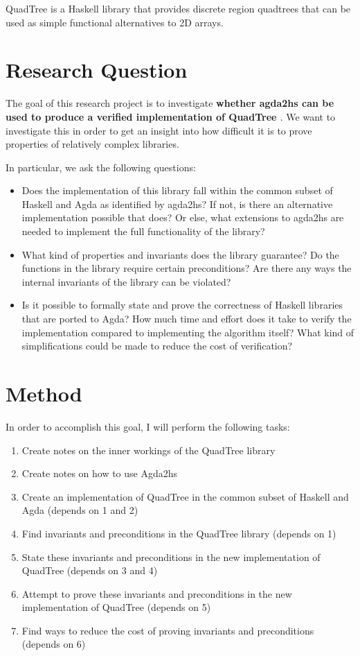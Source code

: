 \documentclass[english]{article}
\begin{document}
QuadTree \cite{quadtree} is a Haskell library that provides discrete region quadtrees that can be used as simple functional alternatives to 2D arrays. 

\section*{Research Question}
The goal of this research project is to investigate \textbf{whether agda2hs \cite{agda2hs} can be used to produce a verified implementation of QuadTree \cite{quadtree}}.
We want to investigate this in order to get an insight into how difficult it is to prove properties of relatively complex libraries. 

In particular, we ask the following questions:
\begin{itemize}
    \item Does the implementation of this library fall within the common subset of Haskell and Agda as identified by agda2hs? If not, is there an alternative implementation possible that does? Or else, what extensions to agda2hs are needed to implement the full functionality of the library?
    \item What kind of properties and invariants does the library guarantee? Do the functions in the library require certain preconditions? Are there any ways the internal invariants of the library can be violated?
    \item Is it possible to formally state and prove the correctness of Haskell libraries that are ported to Agda? How much time and effort does it take to verify the implementation compared to implementing the algorithm itself? What kind of simplifications could be made to reduce the cost of verification?
\end{itemize}

\section*{Method}
In order to accomplish this goal, I will perform the following tasks:
\begin{enumerate}
    \item Create notes on the inner workings of the QuadTree library
    \item Create notes on how to use Agda2hs
    \item Create an implementation of QuadTree in the common subset of Haskell and Agda (depends on 1 and 2)
    \item Find invariants and preconditions in the QuadTree library (depends on 1)
    \item State these invariants and preconditions in the new implementation of QuadTree (depends on 3 and 4)
    \item Attempt to prove these invariants and preconditions in the new implementation of QuadTree (depends on 5)
    \item Find ways to reduce the cost of proving invariants and preconditions (depends on 6)
\end{enumerate}
\end{document}
